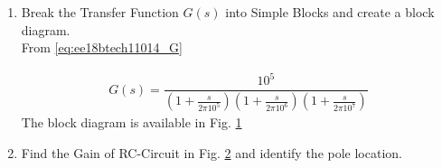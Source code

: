 \begin{enumerate}[label=\thesection.\arabic*.,ref=\thesection.\theenumi]
\item Break the Transfer Function $G(s)$ into Simple Blocks and create a block diagram.
\\
\solution From \eqref{eq:ee18btech11014_G}

\begin{align}
\label{eq:ee18btech11014_Gs}
	G(s) = \dfrac{10^{5}}{\left(1+\frac{s}{2\pi10^{5}}\right)\left(1+\frac{s}{2\pi10^{6}}\right)\left(1+\frac{s}{2\pi10^{7}}\right)}
\end{align}
%
The block diagram is available in 
Fig.  	\ref{fig:ee18btech11014_RC Circuit_block}
%
\begin{figure}[ht!]
	\begin{center}
		\resizebox{\columnwidth}{!}{}
	\end{center}
	\caption{}
	\label{fig:ee18btech11014_RC Circuit_block}
\end{figure}

\item Find the Gain of RC-Circuit in Fig.  \ref{fig:ee18btech11014_RC Circuit} and identify the pole location.
\begin{figure}[ht!]
	\begin{center}
		\resizebox{\columnwidth/2}{!}{}
	\end{center}
	\caption{}
	\label{fig:ee18btech11014_RC Circuit}
\end{figure}


\end{enumerate}
